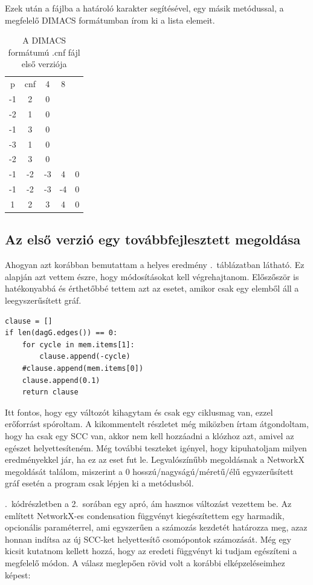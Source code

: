 \documentclass[
]{thesis-ekf}
\theoremstyle{definition}
\theoremstyle{remark}
\begin{document}
	Ezek után a fájlba a határoló karakter segítésével, egy másik metódussal, a megfelelő \textsc{DIMACS} formátumban írom ki a lista elemeit.

	\begin{table}[!ht]
		\centering
		\begin{tabular}{ccccc}
		p & cnf & 4 & 8 &   \\
		-1 &  2 &  0 & &\\
		-2 &  1 &  0 & &\\
		-1 &  3 &  0 & &\\
		-3 &  1 &  0 & &\\
		-2 &  3 &  0 & &\\
		-1 & -2 & -3 &  4 & 0\\
		-1 & -2 & -3 & -4 & 0\\
		 1 &  2 &  3 &  4 & 0\\
		\end{tabular}
		\caption{A \textsc{DIMACS} formátumú .cnf fájl első verziója}
	\end{table}
	
	\subsection{Az első verzió egy továbbfejlesztett megoldása}
	
	Ahogyan azt korábban bemutattam a helyes eredmény \az{\ref{table-esm-cnf}}.~táblázatban látható. Ez alapján azt vettem észre, hogy módosításokat kell végrehajtanom. Előszőször is hatékonyabbá és érthetőbbé tettem azt az esetet, amikor csak egy elemből áll a leegyszerűsített gráf.
	
	\begin{lstlisting}
clause = []
if len(dagG.edges()) == 0:
	for cycle in mem.items[1]:
		clause.append(-cycle)
	#clause.append(mem.items[0])
	clause.append(0.1)
	return clause
	\end{lstlisting}
	
	Itt fontos, hogy egy változót kihagytam és csak egy ciklusmag van, ezzel erőforrást spóroltam. A kikommentelt részletet még miközben írtam átgondoltam, hogy ha csak egy SCC van, akkor nem kell hozzáadni a klózhoz azt, amivel az egészet helyettesíteném. Még további teszteket igényel, hogy kipuhatoljam milyen eredményekkel jár, ha ez az eset fut le. Legvalószínűbb megoldásnak a NetworkX megoldását találom, miszerint a 0 hosszú/nagyságú/méretű/élű egyszerűsített gráf esetén a program csak lépjen ki a metódusból.
	
	\Az{\ref{kod-nx-condensation}}.~kódrészletben a 2.~sorában egy apró, ám hasznos változást vezettem be. Az említett NetworkX-es condensation függvényt kiegészítettem egy harmadik, opcionális paraméterrel, ami egyszerűen a számozás kezdetét határozza meg, azaz honnan indítsa az új SCC-ket helyettesítő csomópontok számozását. Még egy kicsit kutatnom kellett hozzá, hogy az eredeti függvényt ki tudjam egészíteni a megfelelő módon. A válasz meglepően rövid volt a korábbi elképzeléseimhez képest:
\end{document}
